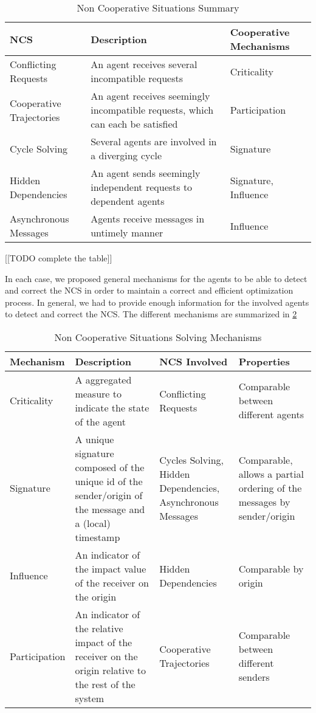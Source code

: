 \begin{table}
\caption{Non Cooperative Situations Summary}\label{NCS_summary}
\centering
\begin{tabular}{lp{5.5cm}p{4.5cm}}
	\toprule
	NCS & Description & Cooperative Mechanisms\\
	\midrule
	Conflicting Requests & An agent receives several incompatible requests & Criticality\\
	Cooperative Trajectories & An agent receives seemingly incompatible requests, which can each be satisfied & Participation\\
	Cycle Solving & Several agents are involved in a diverging cycle & Signature\\
	Hidden Dependencies & An agent sends seemingly independent requests to dependent agents & Signature, Influence\\
	Asynchronous Messages & Agents receive messages in untimely manner & Influence\\
	\bottomrule
\end{tabular}

\end{table}
[[TODO complete the table]]

In each case, we proposed general mechanisms for the agents to be able to detect and correct the NCS in order to maintain a correct and efficient optimization process. In general, we had to provide enough information for the involved agents to detect and correct the NCS. The different mechanisms are summarized in \tablename{} \ref{NCS_mechanisms_summary}

\begin{table}
\caption{Non Cooperative Situations Solving Mechanisms}\label{NCS_mechanisms_summary}
\centering
\begin{tabular}{lp{4cm}p{4cm}p{3.5cm}}
	\toprule
	Mechanism & Description & NCS Involved & Properties\\
	\midrule
	Criticality & A aggregated measure to indicate the state of the agent & Conflicting Requests & Comparable between different agents\\
	Signature & A unique signature composed of the unique id of the sender/origin of the message and a (local) timestamp & Cycles Solving, Hidden Dependencies, Asynchronous Messages & Comparable, allows a partial ordering of the messages by sender/origin\\
	Influence & An indicator of the impact value of the receiver on the origin & Hidden Dependencies & Comparable by origin\\
	 Participation & An indicator of the relative impact of the receiver on the origin relative to the rest of the system & Cooperative Trajectories & Comparable between different senders\\
	\bottomrule
\end{tabular}
\end{table}

